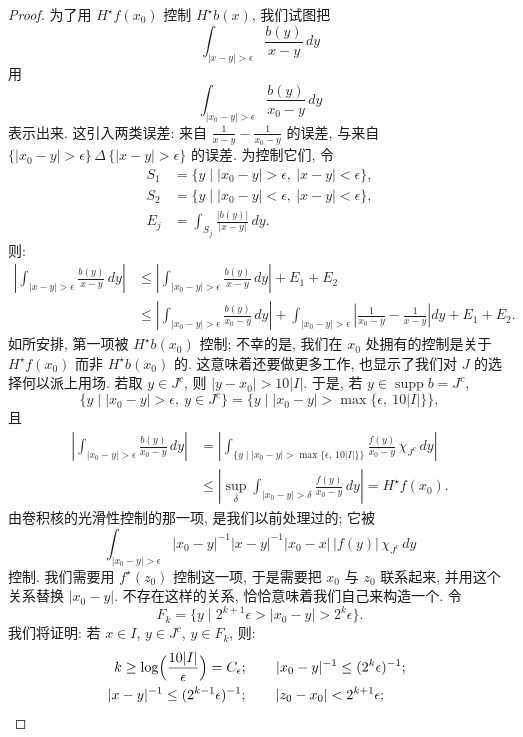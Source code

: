 \begin{proof}
为了用 $H^{\star}f(x_{0})$ 控制 $H^{\star}b(x)$, 我们试图把
\[
\int_{|x-y|>\epsilon}\frac{b(y)}{x-y}\,dy
\]
用
\[
\int_{|x_{0}-y|>\epsilon}\frac{b(y)}{x_{0}-y}\,dy
\]
表示出来. 这引入两类误差: 来自 $\frac{1}{x-y}-\frac{1}{x_0-y}$ 的误差, 与来自 $\{|x_0-y|>\epsilon\}\,\Delta\,\{|x-y|>\epsilon\}$ 的误差. 为控制它们, 令
\begin{align*}
S_{1}&=\{y \mid |x_{0}-y|>\epsilon,\ |x-y|<\epsilon\}, \\
S_{2}&=\{y \mid |x_{0}-y|<\epsilon,\ |x-y|<\epsilon\}, \\
E_{j}&=\int_{S_{j}}\frac{|b(y)|}{|x-y|}\,dy.
\end{align*}
则:
\begin{align*}
\left|\int_{|x-y|>\epsilon}\frac{b(y)}{x-y}\,dy\right|
&\leq\left|\int_{|x_{0}-y|>\epsilon}\frac{b(y)}{x-y}\,dy\right|+E_{1}+E_{2} \\
&\leq\left|\int_{|x_{0}-y|>\epsilon}\frac{b(y)}{x_{0}-y}\,dy\right|
+\int_{|x_{0}-y|>\epsilon}\left|\frac{1}{x_{0}-y}-\frac{1}{x-y}\right|dy+E_{1}+E_{2}.
\end{align*}
如所安排, 第一项被 $H^{\star}b(x_0)$ 控制; 不幸的是, 我们在 $x_0$ 处拥有的控制是关于 $H^{\star}f(x_0)$ 而非 $H^{\star}b(x_0)$ 的. 这意味着还要做更多工作, 也显示了我们对 $J$ 的选择何以派上用场. 若取 $y\in J^{c}$, 则 $|y-x_0|>10|I|$. 于是, 若 $y\in\operatorname{supp}b=J^{c}$,
\[
\{y \mid |x_{0}-y|>\epsilon,\ y\in J^{c}\}=\{y \mid |x_{0}-y|>\max\{\epsilon,\ 10|I|\}\},
\]
且
\begin{align*}
\left|\int_{|x_{0}-y|>\epsilon}\frac{b(y)}{x_{0}-y}\,dy\right|
&=\left|\int_{\{y \mid |x_{0}-y|>\max\{\epsilon,\,10|I|\}\}}\frac{f(y)}{x_{0}-y}\,\chi_{J^{c}}\,dy\right| \\
&\leq\left|\sup_{\delta}\int_{|x_{0}-y|>\delta}\frac{f(y)}{x_{0}-y}\,dy\right|=H^{\star}f(x_{0}).
\end{align*}
由卷积核的光滑性控制的那一项, 是我们以前处理过的; 它被
\[
\int_{|x_{0}-y|>\epsilon}|x_{0}-y|^{-1}|x-y|^{-1}|x_{0}-x|\,|f(y)|\,\chi_{J^{c}}\,dy
\]
控制. 我们需要用 $f^{\star}(z_0)$ 控制这一项, 于是需要把 $x_0$ 与 $z_0$ 联系起来, 并用这个关系替换 $|x_0-y|$. 不存在这样的关系, 恰恰意味着我们自己来构造一个. 令
\[
F_{k}=\{y \mid 2^{k+1}\epsilon>|x_{0}-y|>2^{k}\epsilon\}.
\]
我们将证明: 若 $x\in I$, $y\in J^{c}$, $y\in F_k$, 则:
\begin{gather*}
k\geq\log\Bigl(\frac{10|I|}{\epsilon}\Bigr)=C_{\epsilon};\qquad
|x_{0}-y|^{-1}\leq(2^{k}\epsilon)^{-1}; \\
|x-y|^{-1}\leq(2^{k-1}\epsilon)^{-1};\qquad
|z_{0}-x_{0}|<2^{k+1}\epsilon;\qquad

\end{gather*}
\end{proof}
